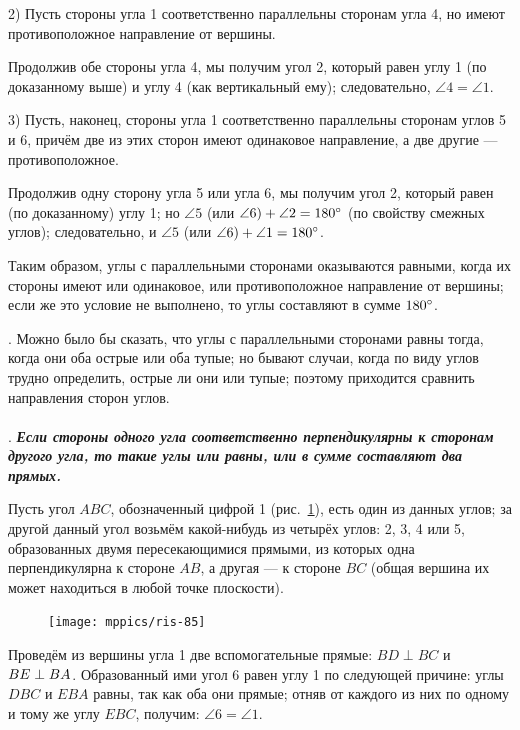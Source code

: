 2) Пусть стороны угла 1 соответственно параллельны сторонам угла 4, но имеют противоположное направление от вершины.

Продолжив обе стороны угла 4, мы получим угол 2, который равен углу 1 (по доказанному выше) и углу 4 (как вертикальный ему);
следовательно, $\angle 4 = \angle 1$.

3) Пусть, наконец, стороны угла 1 соответственно параллельны сторонам углов 5 и 6, причём две из этих сторон имеют одинаковое направление, а две другие — противоположное.

Продолжив одну сторону угла 5 или угла 6, мы получим угол 2, который равен (по доказанному) углу 1;
но $\angle 5$ (или $\angle 6) +\angle 2 \z= 180\degree$ (по свойству смежных углов);
следовательно, и $\angle 5$ (или $\angle 6) \z+ \angle 1 \z= 180\degree$.

Таким образом, углы с параллельными сторонами оказываются равными, когда их стороны имеют или одинаковое, или противоположное направление от вершины;
если же это условие не выполнено, то углы составляют в сумме $180\degree$.

\smallskip
{}.
Можно было бы сказать, что углы с параллельными сторонами равны тогда, когда они оба острые или оба тупые;
но бывают случаи, когда по виду углов трудно определить, острые ли они или тупые;
поэтому приходится сравнить направления сторон углов.

\paragraph{}\label{1938/80}
.
\textbf{\emph{Если стороны одного угла соответственно перпендикулярны к сторонам другого угла, то такие углы или равны, или в сумме составляют два прямых.}}

Пусть угол $ABC$, обозначенный цифрой 1 (рис.~\ref{1938/ris-85}), есть один из данных углов;
за другой данный угол возьмём какой-нибудь из четырёх углов:
2, 3, 4 или 5, образованных двумя пересекающимися прямыми, из которых одна перпендикулярна к стороне $AB$, а другая — к стороне $BC$ (общая вершина их может находиться в любой точке плоскости).

\begin{figure}
\centering
\texttt{[image: mppics/ris-85]}
\caption{}\label{1938/ris-85}
\end{figure}

Проведём из вершины угла 1 две вспомогательные прямые:
$BD\perp BC$ и $BE\z\perp BA$.
Образованный ими угол 6 равен углу 1 по следующей причине:
углы $DBC$ и $EBA$ равны, так как оба они прямые;
отняв от каждого из них по одному и тому же углу $EBC$, получим: $\angle 6 = \angle 1$.

